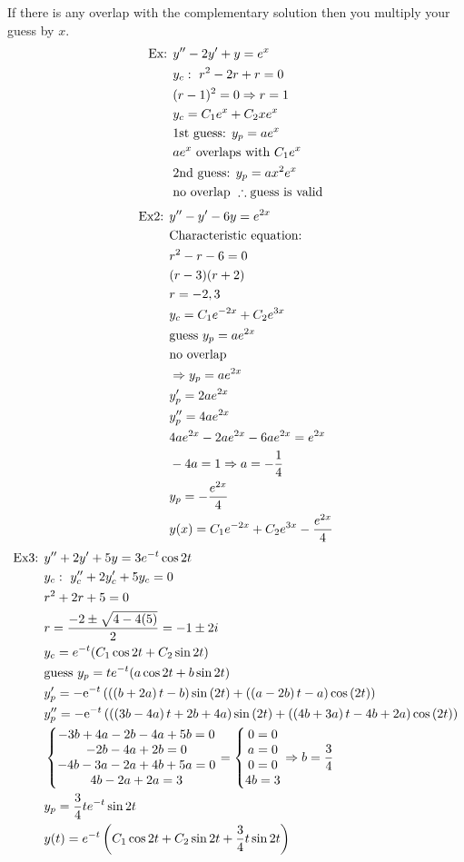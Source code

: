 \documentclass[11pt, fleqn]{article}
\begin{document}
If there is any overlap with the complementary solution then you multiply your guess by $x$.
\begin{align*}
    \text{Ex: }&y''-2y'+y=e^x\\
    &y_c:\ r^2-2r+r=0\\
    &(r-1)^2=0\Rightarrow r=1\\
    &y_c=C_1e^x+C_2xe^x\\
    &\text{1st guess: }y_p=ae^x\\
    &ae^x\text{ overlaps with }C_1e^x\\
    &\text{2nd guess: }y_p=ax^2e^x\\
    &\text{no overlap }\therefore\text{guess is valid}
\end{align*}
\begin{align*}
    \text{Ex2: }&y''-y'-6y=e^{2x}\\
    &\text{Characteristic equation:}\\
    &r^2-r-6=0\\
    &(r-3)(r+2)\\
    &r=-2,3\\
    &y_c=C_1e^{-2x}+C_2e^{3x}\\
    &\text{guess }y_p=ae^{2x}\\
    &\text{no overlap }\\
    &\Rightarrow y_p=ae^{2x}\\
    &y_p'=2ae^{2x}\\
    &y_p''=4ae^{2x}\\
    &4ae^{2x}-2ae^{2x}-6ae^{2x}=e^{2x}\\
    &-4a=1\Rightarrow a=-\frac{1}{4}\\
    &y_p=-\frac{e^{2x}}{4}\\
    &y(x)=C_1e^{-2x}+C_2e^{3x}-\frac{e^{2x}}{4}
\end{align*}
\begin{align*}
    \text{Ex3: }&y''+2y'+5y=3e^{-t}\cos2t\\
    &y_c:\ y_c''+2y_c'+5y_c=0\\
    &r^2+2r+5=0\\
    &r=\frac{-2\pm\sqrt{4-4(5)}}{2}=-1\pm2i\\
    &y_c=e^{-t}(C_1\cos2t+C_2\sin2t)\\
    &\text{guess }y_p=te^{-t}(a\cos2t+b\sin2t)\\
    &y_p'=-\mathrm{e}^{-t}\left(\left(\left(b+2a\right)t-b\right)\sin\left(2t\right)+\left(\left(a-2b\right)t-a\right)\cos\left(2t\right)\right)\\
    &y_p''=-\mathrm{e}^{-t}\left(\left(\left(3b-4a\right)t+2b+4a\right)\sin\left(2t\right)+\left(\left(4b+3a\right)t-4b+2a\right)\cos\left(2t\right)\right)\\
    &\left\{\begin{matrix} -3b+4a-2b-4a+5b=0\\-2b-4a+2b=0\\-4b-3a-2a+4b+5a=0\\4b-2a+2a=3 \end{matrix}\right.=\left\{\begin{matrix} 0=0\\a=0\\0=0\\4b=3 \end{matrix}\right.\Rightarrow b=\frac{3}{4}\\
    &y_p=\frac{3}{4}te^{-t}\sin2t\\
    &y(t)=e^{-t}\left( C_1\cos2t+C_2\sin2t+\frac{3}{4}t\sin2t \right)
\end{align*}
\end{document}
